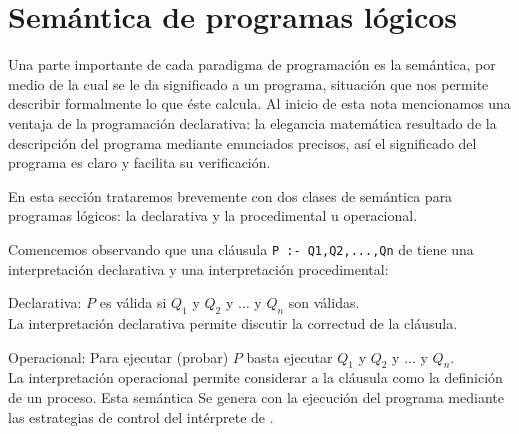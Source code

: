 \documentclass[11pt,letterpaper]{article}
\begin{document}
\begin{center}
\end{center}
\eeje


\section{Sem\'antica de programas l\'ogicos}

Una parte importante de cada paradigma de programaci\'on es la
sem\'antica, por medio de la cual se le da significado a un programa,
situaci\'on que nos permite describir formalmente lo que \'este calcula.
Al inicio de esta nota mencionamos una ventaja de la programación declarativa: 
la elegancia matem\'atica resultado de la descripci\'on del programa mediante 
enunciados precisos, as\'i el significado del programa es claro y facilita su 
verificaci\'on.

\medskip

En esta secci\'on trataremos brevemente con dos clases de sem\'antica para 
programas l\'ogicos: la declarativa y la procedimental u operacional.


Comencemos observando que una cl\'ausula \verb=P :- Q1,Q2,...,Qn= de 
{\pl} tiene una interpretaci\'on declarativa y una interpretaci\'on 
procedimental:
\bi
 \item Declarativa: $P$ es v\'alida si $Q_1$ y $Q_2$ y $\ldots$ y
  $Q_n$ son v\'alidas.\\
  La interpretaci\'on declarativa permite discutir la correctud de
    la cl\'ausula.
 \item Operacional: Para ejecutar (probar) $P$ basta ejecutar $Q_1$ y $Q_2$ y 
  $\ldots$ y $Q_n$. \\
  La interpretaci\'on operacional permite considerar a la cl\'ausula como 
  la definici\'on de un proceso. Esta sem\'antica Se genera con la     
  ejecuci\'on del programa mediante las estrategias de control del int\'erprete 
  de {\pl}.
\ei
\end{document}
